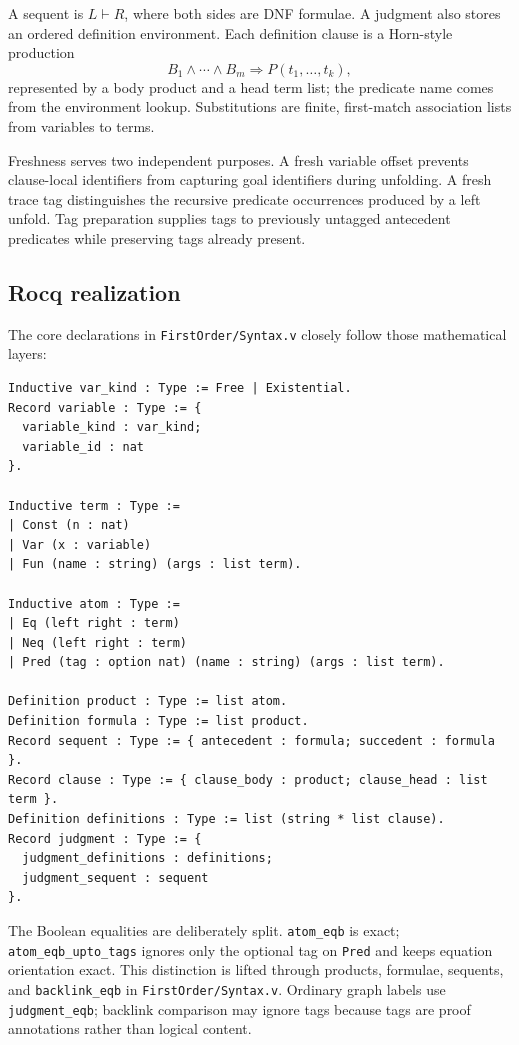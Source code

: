 \documentclass[11pt,oneside]{book}
\DeclareRobustCommand{\code}[1]{\nolinkurl{#1}}
\DeclareRobustCommand{\file}[1]{\nolinkurl{#1}}
\newcommand{\src}[2]{\code{#2} in \file{#1}}
\newcommand{\rocqreal}{\subsection*{Rocq realization}}
\begin{document}
A sequent is \(L\vdash R\), where both sides are DNF formulae.  A judgment
also stores an ordered definition environment.  Each definition clause is a
Horn-style production
\[
  B_1\land\cdots\land B_m \Longrightarrow P(t_1,\ldots,t_k),
\]
represented by a body product and a head term list; the predicate name comes
from the environment lookup.  Substitutions are finite, first-match association
lists from variables to terms.

Freshness serves two independent purposes.  A fresh variable offset prevents
clause-local identifiers from capturing goal identifiers during unfolding.  A
fresh trace tag distinguishes the recursive predicate occurrences produced by
a left unfold.  Tag preparation supplies tags to previously untagged
antecedent predicates while preserving tags already present.

\rocqreal

The core declarations in \file{FirstOrder/Syntax.v} closely follow those
mathematical layers:
\begin{lstlisting}[caption={The reified object language; selected declarations from Syntax.v.}]
Inductive var_kind : Type := Free | Existential.
Record variable : Type := {
  variable_kind : var_kind;
  variable_id : nat
}.

Inductive term : Type :=
| Const (n : nat)
| Var (x : variable)
| Fun (name : string) (args : list term).

Inductive atom : Type :=
| Eq (left right : term)
| Neq (left right : term)
| Pred (tag : option nat) (name : string) (args : list term).

Definition product : Type := list atom.
Definition formula : Type := list product.
Record sequent : Type := { antecedent : formula; succedent : formula }.
Record clause : Type := { clause_body : product; clause_head : list term }.
Definition definitions : Type := list (string * list clause).
Record judgment : Type := {
  judgment_definitions : definitions;
  judgment_sequent : sequent
}.
\end{lstlisting}

The Boolean equalities are deliberately split.  \code{atom_eqb} is exact;
\code{atom_eqb_upto_tags} ignores only the optional tag on \code{Pred} and
keeps equation orientation exact.  This distinction is lifted through
products, formulae, sequents, and \src{FirstOrder/Syntax.v}{backlink_eqb}.
Ordinary graph labels use \code{judgment_eqb}; backlink comparison may ignore
tags because tags are proof annotations rather than logical content.
\end{document}
